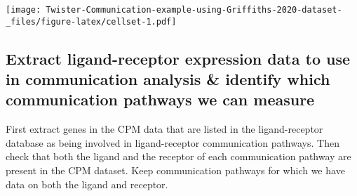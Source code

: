 \documentclass[
]{article}
\begin{document}
\texttt{[image: Twister-Communication-example-using-Griffiths-2020-dataset-\_files/figure-latex/cellset-1.pdf]}

\hypertarget{extract-ligand-receptor-expression-data-to-use-in-communication-analysis-identify-which-communication-pathways-we-can-measure}{%
\subsection{Extract ligand-receptor expression data to use in
communication analysis \& identify which communication pathways we can
measure}\label{extract-ligand-receptor-expression-data-to-use-in-communication-analysis-identify-which-communication-pathways-we-can-measure}}

First extract genes in the CPM data that are listed in the
ligand-receptor database as being involved in ligand-receptor
communication pathways. Then check that both the ligand and the receptor
of each communication pathway are present in the CPM dataset. Keep
communication pathways for which we have data on both the ligand and
receptor.
\end{document}
